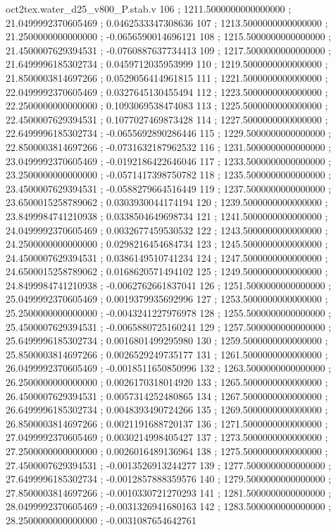 \begin{filecontents}[overwrite]{oct2tex.water_d25_v800_P.stab.v}
106 ; 1211.5000000000000000 ; 21.0499992370605469 ; 0.0462533347308636
107 ; 1213.5000000000000000 ; 21.2500000000000000 ; -0.0656590014696121
108 ; 1215.5000000000000000 ; 21.4500007629394531 ; -0.0760887637734413
109 ; 1217.5000000000000000 ; 21.6499996185302734 ; 0.0459712035953999
110 ; 1219.5000000000000000 ; 21.8500003814697266 ; 0.0529056414961815
111 ; 1221.5000000000000000 ; 22.0499992370605469 ; 0.0327645130455494
112 ; 1223.5000000000000000 ; 22.2500000000000000 ; 0.1093069538474083
113 ; 1225.5000000000000000 ; 22.4500007629394531 ; 0.1077027469873428
114 ; 1227.5000000000000000 ; 22.6499996185302734 ; -0.0655692890286446
115 ; 1229.5000000000000000 ; 22.8500003814697266 ; -0.0731632187962532
116 ; 1231.5000000000000000 ; 23.0499992370605469 ; -0.0192186422646046
117 ; 1233.5000000000000000 ; 23.2500000000000000 ; -0.0571417398750782
118 ; 1235.5000000000000000 ; 23.4500007629394531 ; -0.0588279664516449
119 ; 1237.5000000000000000 ; 23.6500015258789062 ; 0.0303930044174194
120 ; 1239.5000000000000000 ; 23.8499984741210938 ; 0.0338504649698734
121 ; 1241.5000000000000000 ; 24.0499992370605469 ; 0.0032677459530532
122 ; 1243.5000000000000000 ; 24.2500000000000000 ; 0.0298216454684734
123 ; 1245.5000000000000000 ; 24.4500007629394531 ; 0.0386149510741234
124 ; 1247.5000000000000000 ; 24.6500015258789062 ; 0.0168620571494102
125 ; 1249.5000000000000000 ; 24.8499984741210938 ; -0.0062762661837041
126 ; 1251.5000000000000000 ; 25.0499992370605469 ; 0.0019379935692996
127 ; 1253.5000000000000000 ; 25.2500000000000000 ; -0.0043241227976978
128 ; 1255.5000000000000000 ; 25.4500007629394531 ; -0.0065880725160241
129 ; 1257.5000000000000000 ; 25.6499996185302734 ; 0.0016801499295980
130 ; 1259.5000000000000000 ; 25.8500003814697266 ; 0.0026529249735177
131 ; 1261.5000000000000000 ; 26.0499992370605469 ; -0.0018511650850996
132 ; 1263.5000000000000000 ; 26.2500000000000000 ; 0.0026170318014920
133 ; 1265.5000000000000000 ; 26.4500007629394531 ; 0.0057314252480865
134 ; 1267.5000000000000000 ; 26.6499996185302734 ; 0.0048393490724266
135 ; 1269.5000000000000000 ; 26.8500003814697266 ; 0.0021191688720137
136 ; 1271.5000000000000000 ; 27.0499992370605469 ; 0.0030214998405427
137 ; 1273.5000000000000000 ; 27.2500000000000000 ; 0.0026016489136964
138 ; 1275.5000000000000000 ; 27.4500007629394531 ; -0.0013526913244277
139 ; 1277.5000000000000000 ; 27.6499996185302734 ; -0.0012857888359576
140 ; 1279.5000000000000000 ; 27.8500003814697266 ; -0.0010330721270293
141 ; 1281.5000000000000000 ; 28.0499992370605469 ; -0.0031326941680163
142 ; 1283.5000000000000000 ; 28.2500000000000000 ; -0.0031087654642761

\end{filecontents}
